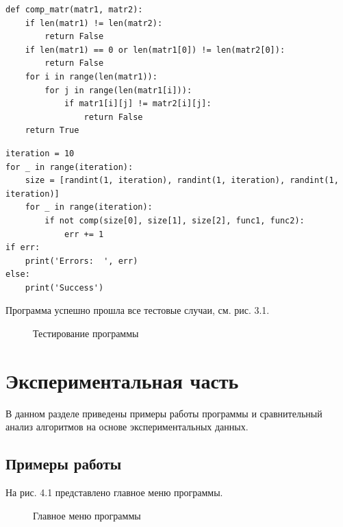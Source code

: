 \documentclass[12pt]{report}
\begin{document}
\begin{lstlisting}[label=some-code,caption=Функция сравнения матриц]
def comp_matr(matr1, matr2):
	if len(matr1) != len(matr2):
		return False
	if len(matr1) == 0 or len(matr1[0]) != len(matr2[0]):
		return False
	for i in range(len(matr1)):
		for j in range(len(matr1[i])):
			if matr1[i][j] != matr2[i][j]:
				return False
	return True
\end{lstlisting}

\begin{lstlisting}[label=some-code,caption=Функция тестирования двух алгоритмов]
iteration = 10
for _ in range(iteration):
	size = [randint(1, iteration), randint(1, iteration), randint(1, iteration)]
	for _ in range(iteration):
		if not comp(size[0], size[1], size[2], func1, func2):
			err += 1
if err:
	print('Errors:  ', err)
else:
	print('Success')
\end{lstlisting}

\begin{flushleft}

\end{flushleft}

Программа успешно прошла все тестовые случаи, см. рис. 3.1. 

\begin{figure}[h]
	\caption{Тестирование программы}
	\label{figure:image}
\end{figure}

\chapter{Экспериментальная часть}

В данном разделе приведены примеры работы программы и сравнительный анализ алгоритмов на основе экспериментальных данных. 

\section{Примеры работы} 
 
На рис. 4.1 представлено главное меню программы. 

\begin{figure}[h]
	\caption{Главное меню программы}
	\label{figure:image}
\end{figure}
\end{document}
